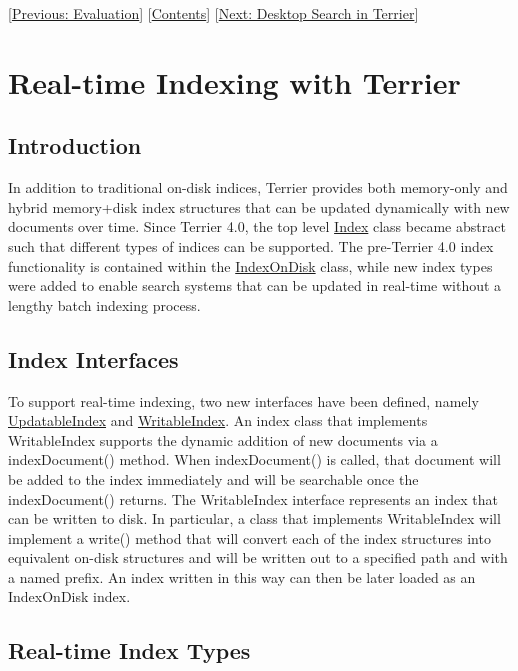 {[}\href{evaluation.html}{Previous: Evaluation}{]}
{[}\href{index.html}{Contents}{]} {[}\href{terrier_desktop.html}{Next:
Desktop Search in Terrier}{]}\\

\section{Real-time Indexing with
Terrier}\label{real-time-indexing-with-terrier}

\subsection{Introduction}\label{introduction}

In addition to traditional on-disk indices, Terrier provides both
memory-only and hybrid memory+disk index structures that can be updated
dynamically with new documents over time. Since Terrier 4.0, the top
level \href{javadoc/org/terrier/structures/Index.html}{Index} class
became abstract such that different types of indices can be supported.
The pre-Terrier 4.0 index functionality is contained within the
\href{javadoc/org/terrier/structures/IndexOnDisk.html}{IndexOnDisk}
class, while new index types were added to enable search systems that
can be updated in real-time without a lengthy batch indexing process.

\subsection{Index Interfaces}\label{index-interfaces}

To support real-time indexing, two new interfaces have been defined,
namely
\href{javadoc/org/terrier/realtime/UpdatableIndex.html}{UpdatableIndex}
and
\href{javadoc/org/terrier/realtime/WritableIndex.html}{WritableIndex}.
An index class that implements WritableIndex supports the dynamic
addition of new documents via a indexDocument() method. When
indexDocument() is called, that document will be added to the index
immediately and will be searchable once the indexDocument() returns. The
WritableIndex interface represents an index that can be written to disk.
In particular, a class that implements WritableIndex will implement a
write() method that will convert each of the index structures into
equivalent on-disk structures and will be written out to a specified
path and with a named prefix. An index written in this way can then be
later loaded as an IndexOnDisk index.

\subsection{Real-time Index Types}\label{real-time-index-types}

